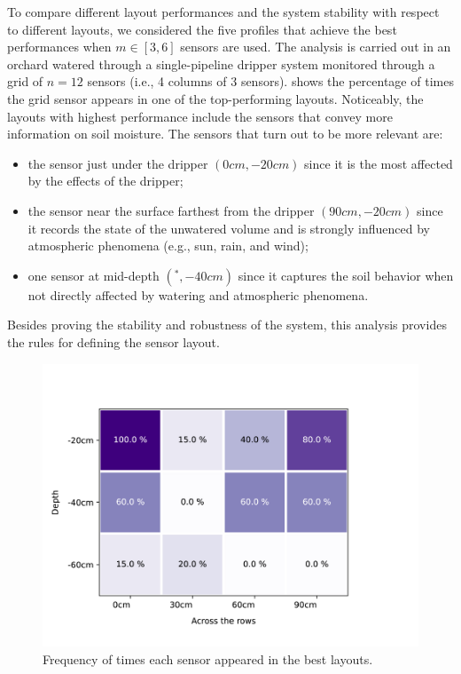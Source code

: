 To compare different layout performances and the system stability with respect to different layouts, we considered the five profiles that achieve the best performances when $m \in [3, 6]$ sensors are used. 
The analysis is carried out in an orchard watered through a single-pipeline dripper system monitored through a grid of $n=12$ sensors (i.e., 4 columns of 3 sensors). 
shows the percentage of times the grid sensor appears in one of the top-performing layouts. 
Noticeably, the layouts with highest performance include the sensors that convey more information on soil moisture.
The sensors that turn out to be more relevant are:
\begin{itemize}
    \item the sensor just under the dripper $(0cm, -20cm)$ since it is the most affected by the effects of the dripper;
    \item the sensor near the surface farthest from the dripper $(90cm, -20cm)$ since it records the state of the unwatered volume and is strongly influenced by atmospheric phenomena (e.g., sun, rain, and wind);
    \item one sensor at mid-depth $(^*, -40cm)$ since it captures the soil behavior when not directly affected by watering and atmospheric phenomena.
\end{itemize}
Besides proving the stability and robustness of the system, this analysis provides the rules for defining the sensor layout.
\begin{figure}[t]
\centering
\includegraphics[scale=.6]{chapters/physics-aware/pluto/img/heatmap.pdf}
\caption{Frequency of times each sensor appeared in the best layouts.}
\label{pluto-fig:2D_sensors_importance}
\end{figure}

